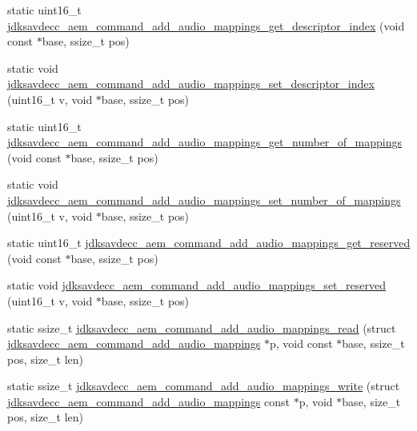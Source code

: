 \begin{DoxyCompactItemize}
\item 
static uint16\+\_\+t \hyperlink{group__command__add__audio__mappings_gad1fbba911b4812ed813ce343d509dba6}{jdksavdecc\+\_\+aem\+\_\+command\+\_\+add\+\_\+audio\+\_\+mappings\+\_\+get\+\_\+descriptor\+\_\+index} (void const $\ast$base, ssize\+\_\+t pos)
\item 
static void \hyperlink{group__command__add__audio__mappings_gac407406f3e3e238c530716451259691e}{jdksavdecc\+\_\+aem\+\_\+command\+\_\+add\+\_\+audio\+\_\+mappings\+\_\+set\+\_\+descriptor\+\_\+index} (uint16\+\_\+t v, void $\ast$base, ssize\+\_\+t pos)
\item 
static uint16\+\_\+t \hyperlink{group__command__add__audio__mappings_ga764619e184c30148008068d6768111f8}{jdksavdecc\+\_\+aem\+\_\+command\+\_\+add\+\_\+audio\+\_\+mappings\+\_\+get\+\_\+number\+\_\+of\+\_\+mappings} (void const $\ast$base, ssize\+\_\+t pos)
\item 
static void \hyperlink{group__command__add__audio__mappings_ga642d08721d3b68c9841aa4f9d265d0b8}{jdksavdecc\+\_\+aem\+\_\+command\+\_\+add\+\_\+audio\+\_\+mappings\+\_\+set\+\_\+number\+\_\+of\+\_\+mappings} (uint16\+\_\+t v, void $\ast$base, ssize\+\_\+t pos)
\item 
static uint16\+\_\+t \hyperlink{group__command__add__audio__mappings_ga32953f4154dba572ad4f6fca82b0b19a}{jdksavdecc\+\_\+aem\+\_\+command\+\_\+add\+\_\+audio\+\_\+mappings\+\_\+get\+\_\+reserved} (void const $\ast$base, ssize\+\_\+t pos)
\item 
static void \hyperlink{group__command__add__audio__mappings_gac85906038b2561f8c012affa8fa8eac3}{jdksavdecc\+\_\+aem\+\_\+command\+\_\+add\+\_\+audio\+\_\+mappings\+\_\+set\+\_\+reserved} (uint16\+\_\+t v, void $\ast$base, ssize\+\_\+t pos)
\item 
static ssize\+\_\+t \hyperlink{group__command__add__audio__mappings_gaf9c4b538fd11978b5ec8bba2161b7ee6}{jdksavdecc\+\_\+aem\+\_\+command\+\_\+add\+\_\+audio\+\_\+mappings\+\_\+read} (struct \hyperlink{structjdksavdecc__aem__command__add__audio__mappings}{jdksavdecc\+\_\+aem\+\_\+command\+\_\+add\+\_\+audio\+\_\+mappings} $\ast$p, void const $\ast$base, ssize\+\_\+t pos, size\+\_\+t len)
\item 
static ssize\+\_\+t \hyperlink{group__command__add__audio__mappings_ga406afad9c22c864d81b8737f39eaf2cc}{jdksavdecc\+\_\+aem\+\_\+command\+\_\+add\+\_\+audio\+\_\+mappings\+\_\+write} (struct \hyperlink{structjdksavdecc__aem__command__add__audio__mappings}{jdksavdecc\+\_\+aem\+\_\+command\+\_\+add\+\_\+audio\+\_\+mappings} const $\ast$p, void $\ast$base, size\+\_\+t pos, size\+\_\+t len)
\end{DoxyCompactItemize}


